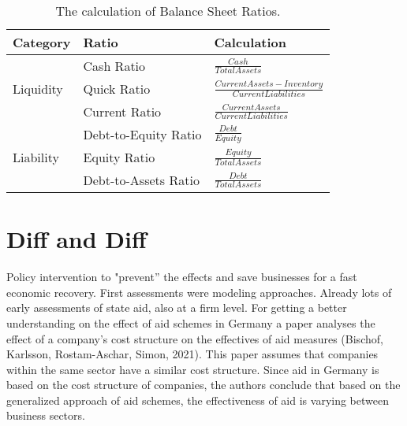 \begin{table}%
    \caption{The calculation of Balance Sheet Ratios.}
    \label{tab:RatioCalc}
    \centering
    \def\arraystretch{1.5}
    \begin{tabular}{@{}lll@{}}
    \toprule
    Category                   & Ratio                & Calculation \\ \midrule
    \multirow{3}{*}{Liquidity} & Cash Ratio           & $\frac{Cash}{Total Assets}$ \\ %
                                & Quick Ratio          & $\frac{Current Assets-Inventory}{Current Liabilities}$ \\ %
                                & Current Ratio        & $\frac{Current Assets}{Current Liabilities}$ \\ \midrule
    \multirow{3}{*}{Liability} & Debt-to-Equity Ratio & $\frac{Debt}{Equity}$ \\ %
                                & Equity Ratio         & $\frac{Equity}{Total Assets}$ \\ %
                                & Debt-to-Assets Ratio & $\frac{Debt}{Total Assets}$ \\ \bottomrule
    \end{tabular}
    \end{table}


\section{Diff and Diff}

Policy intervention to "prevent” the effects and save businesses for a fast economic recovery.
First assessments were modeling approaches.
Already lots of early assessments of state aid, also at a firm level.
For getting a better understanding on the effect of aid schemes in Germany a paper analyses the effect of a company’s cost structure on the effectives of aid measures (Bischof, Karlsson, Rostam-Aschar, Simon, 2021). 
This paper assumes that companies within the same sector have a similar cost structure. 
Since aid in Germany is based on the cost structure of companies, the authors conclude that based on the generalized approach of aid schemes, the effectiveness of aid is varying between business sectors.


